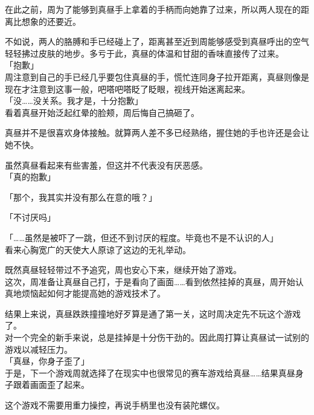 在此之前，周为了能够到真昼手上拿着的手柄而向她靠了过来，所以两人现在的距离比想象的还要近。

不如说，两人的胳膊和手已经碰上了，距离甚至近到周能够感受到真昼呼出的空气轻轻拂过皮肤的地步。多亏于此，真昼的体温和甘甜的香味直接传了过来。\\

「抱歉」\\

周注意到自己的手已经几乎要包住真昼的手，慌忙连同身子拉开距离，真昼则像是现在才注意到这事一般，吧嗒吧嗒眨了眨眼，视线开始迷离起来。\\

「没……没关系。我才是，十分抱歉」\\

看着真昼开始泛起红晕的脸颊，周后悔自己搞砸了。

真昼并不是很喜欢身体接触。就算两人差不多已经熟络，握住她的手也许还是会让她不快。

虽然真昼看起来有些害羞，但这并不代表没有厌恶感。\\

「真的抱歉」

「那个，我其实并没有那么在意的哦？」

「不讨厌吗」

「……虽然是被吓了一跳，但还不到讨厌的程度。毕竟也不是不认识的人」\\

看来心胸宽广的天使大人原谅了这边的无礼举动。

既然真昼轻轻带过不予追究，周也安心下来，继续开始了游戏。\\

这次，周准备让真昼自己打，于是看向了画面……看到依然挂掉的真昼，周开始认真地烦恼起如何才能提高她的游戏技术了。\\

\vspace{2\baselineskip}

结果上来说，真昼跌跌撞撞地好歹算是通了第一关，这时周决定先不玩这个游戏了。\\

对一个完全的新手来说，总是挂掉是十分伤干劲的。因此周打算让真昼试一试别的游戏以减轻压力。\\

「真昼，你身子歪了」\\

于是，下一个游戏周就选择了在现实中也很常见的赛车游戏给真昼……结果真昼身子跟着画面歪了起来。

这个游戏不需要用重力操控，再说手柄里也没有装陀螺仪。\\

